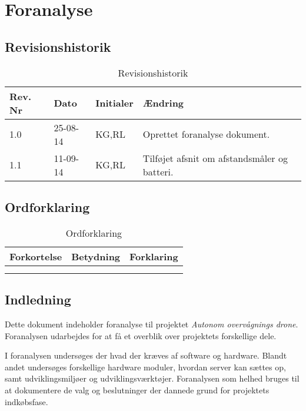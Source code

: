 \chapter{Foranalyse}

\section{Revisionshistorik}
\begin{table}[H]
	\centering
		\begin{tabular}{|p{2 cm}|p{2 cm}|p{3 cm}|p{6 cm}|} 
		\hline
			\textbf{Rev. Nr} & \textbf{Dato}		& \textbf{Initialer} 	& \textbf{Ændring} \\ \hline
			1.0 	& 25-08-14	& KG,RL		& Oprettet foranalyse dokument.	\\ \hline
			1.1 	& 11-09-14	& KG,RL		& Tilføjet afsnit om afstandsmåler og batteri.	\\ \hline
		\end{tabular}
	\caption{Revisionshistorik}
\end{table}

\vspace{1.5cm}

\section{Ordforklaring}
\begin{table}[H]
	\centering
		\begin{tabular}{|p{2.5cm}|p{4.5 cm}|p{6.5 cm}|} 
		\hline
			\textbf{Forkortelse} & \textbf{Betydning} & \textbf{Forklaring} \\ \hline
			 &  &  \\ \hline
			 &  & \\ \hline
		\end{tabular}
	\caption{Ordforklaring}
\end{table}

\vspace{2cm}

\section{Indledning}

Dette dokument indeholder foranalyse til projektet \textit{Autonom overvågnings drone}. 
Foranalysen udarbejdes for at få et overblik over projektets forskellige dele. 

I foranalysen undersøges der hvad der kræves af software og hardware. Blandt andet undersøges forskellige hardware moduler, hvordan server kan sættes op, samt udviklingsmiljøer og udviklingsværktøjer. Foranalysen som helhed bruges til at dokumentere de valg og beslutninger der dannede grund for projektets indkøbsfase. 
